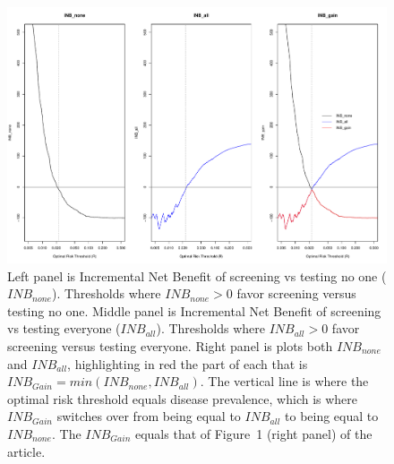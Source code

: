 \documentclass[AMA,STIX1COL]{WileyNJD-v2}
\begin{document}
\begin{figure}[t!]
	\centering
	\includegraphics[angle=-0,width=6.5in,]{INBnonevsINBallvsINBgain.pdf}
	\caption{Left panel is Incremental Net Benefit of screening vs testing no one ($I\!N\!B_{none}$).  Thresholds where $I\!N\!B_{none}>0$ favor screening versus testing no one.  Middle panel is Incremental Net Benefit of screening vs testing everyone ($I\!N\!B_{all}$).  Thresholds where $I\!N\!B_{all}>0$ favor screening versus testing everyone.  Right panel is plots both $I\!N\!B_{none}$ and $I\!N\!B_{all}$, highlighting in red the part of each that is $I\!N\!B_{Gain}=min(I\!N\!B_{none},I\!N\!B_{all})$. The vertical line is where the optimal risk threshold equals disease prevalence, which is where $I\!N\!B_{Gain}$ switches over from being equal to $I\!N\!B_{all}$ to being equal to $I\!N\!B_{none}$.  The $I\!N\!B_{Gain}$ equals that of Figure~1 (right panel) of the article.}
	\label{fig:INBnonevsINBallvsINBgain}
\end{figure}
\end{document}
